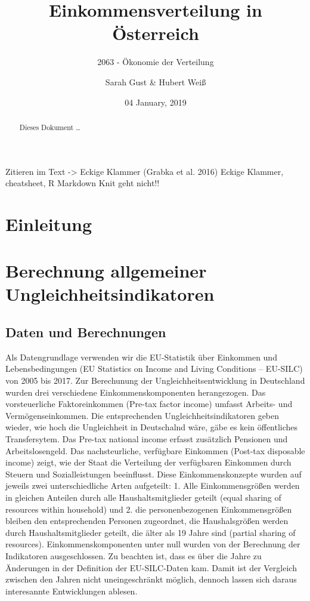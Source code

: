 \documentclass[12pt,]{article}
\title{Einkommensverteilung in Österreich}
\subtitle{2063 - Ökonomie der Verteilung}
\author{Sarah Gust \& Hubert Weiß}
\date{04 January, 2019}
\begin{document}
\maketitle
\begin{abstract}
Dieses Dokument \ldots{}
\end{abstract}

{
\setcounter{tocdepth}{2}
\tableofcontents
}
Zitieren im Text -\textgreater{} Eckige Klammer (Grabka et al. 2016)
Eckige Klammer, cheatsheet, R Markdown Knit geht nicht!!

\newpage

\section{Einleitung}\label{einleitung}

\section{Berechnung allgemeiner
Ungleichheitsindikatoren}\label{berechnung-allgemeiner-ungleichheitsindikatoren}

\subsection{Daten und Berechnungen}\label{daten-und-berechnungen}

Als Datengrundlage verwenden wir die EU-Statistik über Einkommen und
Lebensbedingungen (EU Statistics on Income and Living Conditions --
EU-SILC) von 2005 bis 2017. Zur Berechunung der Ungleichheitsentwicklung
in Deutschland wurden drei verschiedene Einkommenskomponenten
herangezogen. Das vorsteuerliche Faktoreinkommen (Pre-tax factor income)
umfasst Arbeits- und Vermögenseinkommen. Die entsprechenden
Ungleichheitsindikatoren geben wieder, wie hoch die Ungleichheit in
Deutschalnd wäre, gäbe es kein öffentliches Transfersytem. Das Pre-tax
national income erfasst zusätzlich Pensionen und Arbeitslosengeld. Das
nachsteurliche, verfügbare Einkommen (Post-tax disposable income) zeigt,
wie der Staat die Verteilung der verfügbaren Einkommen durch Steuern und
Sozialleistungen beeinflusst. Diese Einkommenskonzepte wurden auf
jeweils zwei unterschiedliche Arten aufgeteilt: 1. Alle Einkommensgrößen
werden in gleichen Anteilen durch alle Haushaltsmitglieder geteilt
(equal sharing of resources within household) und 2. die
personenbezogenen Einkommensgrößen bleiben den entsprechenden Personen
zugeordnet, die Haushalsgrößen werden durch Haushaltsmitglieder geteilt,
die älter als 19 Jahre sind (partial sharing of resources).
Einkommenskomponenten unter null wurden von der Berechnung der
Indikatoren ausgeschlossen. Zu beachten ist, dass es über die Jahre zu
Änderungen in der Definition der EU-SILC-Daten kam. Damit ist der
Vergleich zwischen den Jahren nicht uneingeschränkt möglich, dennoch
lassen sich daraus interesannte Entwicklungen ablesen.
\end{document}
